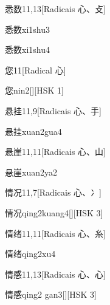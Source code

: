 \begin{entry}{悉数}{11,13}[Radicais ⼼、⽁]
  \begin{phonetics}{悉数}{xi1shu3}
  \end{phonetics}
  \begin{phonetics}{悉数}{xi1shu4}
  \end{phonetics}
\end{entry}

\begin{entry}{您}{11}[Radical ⼼]
  \begin{phonetics}{您}{nin2}[][HSK 1]
  \end{phonetics}
\end{entry}

\begin{entry}{悬挂}{11,9}[Radicais ⼼、⼿]
  \begin{phonetics}{悬挂}{xuan2gua4}
  \end{phonetics}
\end{entry}

\begin{entry}{悬崖}{11,11}[Radicais ⼼、⼭]
  \begin{phonetics}{悬崖}{xuan2ya2}
  \end{phonetics}
\end{entry}

\begin{entry}{情况}{11,7}[Radicais ⼼、⼎]
  \begin{phonetics}{情况}{qing2kuang4}[][HSK 3]
  \end{phonetics}
\end{entry}

\begin{entry}{情绪}{11,11}[Radicais ⼼、⽷]
  \begin{phonetics}{情绪}{qing2xu4}
  \end{phonetics}
\end{entry}

\begin{entry}{情感}{11,13}[Radicais ⼼、⼼]
  \begin{phonetics}{情感}{qing2 gan3}[][HSK 3]
  \end{phonetics}
\end{entry}

